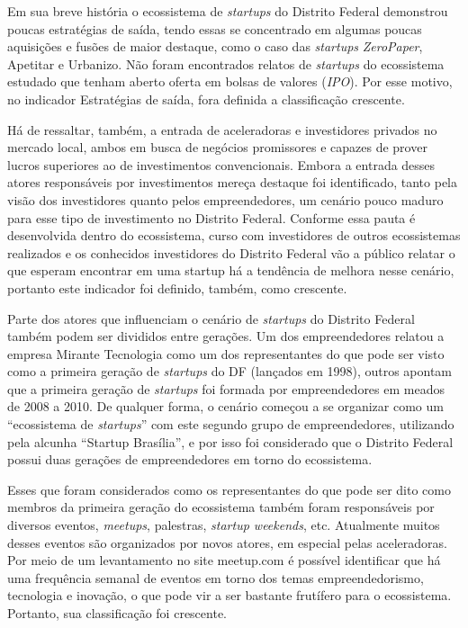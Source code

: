 Em sua breve história o ecossistema de \textit{startups} do Distrito Federal demonstrou poucas estratégias de saída, tendo essas se concentrado em algumas poucas aquisições e fusões de maior destaque, como o caso das \textit{startups} \textit{ZeroPaper}, Apetitar e Urbanizo. Não foram encontrados relatos de \textit{startups} do ecossistema estudado que tenham aberto oferta em bolsas de valores (\textit{IPO}). Por esse motivo, no indicador Estratégias de saída, fora definida a classificação crescente. 

Há de ressaltar, também, a entrada de aceleradoras e investidores privados no mercado local, ambos em busca de negócios promissores e capazes de prover lucros superiores ao de investimentos convencionais. Embora a entrada desses atores responsáveis por investimentos mereça destaque foi identificado, tanto pela visão dos investidores quanto pelos empreendedores, um cenário pouco maduro para esse tipo de investimento no Distrito Federal. Conforme essa pauta é desenvolvida dentro do ecossistema, curso com investidores de outros ecossistemas realizados e os conhecidos investidores do Distrito Federal vão a público relatar o que esperam encontrar em uma startup há a tendência de melhora nesse cenário, portanto este indicador foi definido, também, como crescente.

Parte dos atores que influenciam o cenário de \textit{startups} do Distrito Federal também podem ser divididos entre gerações. Um dos empreendedores relatou a empresa Mirante Tecnologia como um dos representantes do que pode ser visto como a primeira geração de \textit{startups} do DF (lançados em 1998), outros apontam que a primeira geração de \textit{startups} foi formada por empreendedores em meados de 2008 a 2010. De qualquer forma, o cenário começou a se organizar como um ``ecossistema de \textit{startups}'' com este segundo grupo de empreendedores, utilizando pela alcunha ``Startup Brasília'', e por isso foi considerado que o Distrito Federal possui duas gerações de empreendedores em torno do ecossistema.

Esses que foram considerados como os representantes do que pode ser dito como membros da primeira geração do ecossistema também foram responsáveis por diversos eventos, \textit{meetups}, palestras, \textit{startup weekends}, etc. Atualmente muitos desses eventos são organizados por novos atores, em especial pelas aceleradoras. Por meio de um levantamento no site meetup.com é possível identificar que há uma frequência semanal de eventos em torno dos temas empreendedorismo, tecnologia e inovação, o que pode vir a ser bastante frutífero para o ecossistema. Portanto, sua classificação foi crescente.

